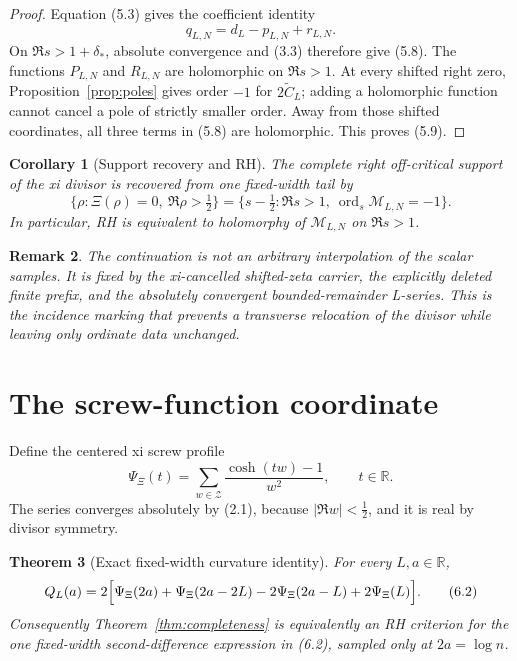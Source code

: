 \documentclass[11pt]{article}
\newtheorem{theorem}{Theorem}[section]
\newtheorem{corollary}[theorem]{Corollary}
\newtheorem{remark}[theorem]{Remark}
\newcommand{\R}{\mathbb R}
\newcommand{\XiR}{\Xi}
\newcommand{\cZ}{\mathcal Z}
\newcommand{\cM}{\mathcal M}
\newcommand{\ord}{\operatorname{ord}}
\begin{document}
\begin{proof}
Equation (5.3) gives the coefficient identity
\[
  q_{L,N}=d_L-p_{L,N}+r_{L,N}.
\]
On $\Re s>1+\delta_*$, absolute convergence and (3.3) therefore give (5.8).
The functions $P_{L,N}$ and $R_{L,N}$ are holomorphic on $\Re s>1$.  At every shifted right
zero, Proposition~\ref{prop:poles} gives order $-1$ for $2\widetilde C_L$; adding a holomorphic
function cannot cancel a pole of strictly smaller order.  Away from those shifted coordinates,
all three terms in (5.8) are holomorphic.  This proves (5.9).
\end{proof}

\begin{corollary}[Support recovery and RH]\label{cor:tomography}
The complete right off-critical support of the xi divisor is recovered from one fixed-width tail
by
\[
  \{\rho:\XiR(\rho)=0,\ \Re\rho>\tfrac12\}
  =\{s-\tfrac12:\Re s>1,\ \ord_s\cM_{L,N}=-1\}.
  \tag{5.10}
\]
In particular, RH is equivalent to holomorphy of $\cM_{L,N}$ on $\Re s>1$.
\end{corollary}

\begin{remark}
The continuation is not an arbitrary interpolation of the scalar samples.  It is fixed by the
xi-cancelled shifted-zeta carrier, the explicitly deleted finite prefix, and the absolutely
convergent bounded-remainder L-series.  This is the incidence marking that prevents a
transverse relocation of the divisor while leaving only ordinate data unchanged.
\end{remark}

\section{The screw-function coordinate}

Define the centered xi screw profile
\[
  \Psi_\Xi(t)=\sum_{w\in\cZ}\frac{\cosh(tw)-1}{w^2},
  \qquad t\in\R.
  \tag{6.1}
\]
The series converges absolutely by (2.1), because $|\Re w|<\frac12$, and it is real by divisor
symmetry.

\begin{theorem}[Exact fixed-width curvature identity]\label{thm:screw}
For every $L,a\in\R$,
\[
  Q_L(a)=2\Bigl[
    \Psi_\Xi(2a)+\Psi_\Xi(2a-2L)-2\Psi_\Xi(2a-L)+2\Psi_\Xi(L)
  \Bigr].
  \tag{6.2}
\]
Consequently Theorem~\ref{thm:completeness} is equivalently an RH criterion for the one
fixed-width second-difference expression in (6.2), sampled only at $2a=\log n$.
\end{theorem}
\end{document}
